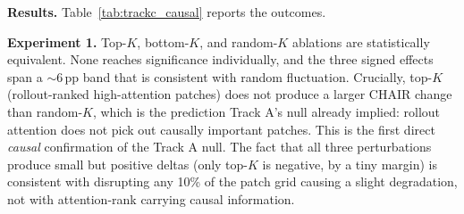\documentclass[11pt]{article}
\begin{document}
\textbf{Results.} Table~\ref{tab:trackc_causal} reports the outcomes.

\begin{table}[!ht]
\centering
\caption{Approach 2 part B causal ablation results. Wilcoxon signed-rank vs.\ baseline
         (paired, two-sided) for CHAIR change. McNemar tests hallucination-status flip
         for the matched-clean swap.}
\label{tab:trackc_causal}
\end{table}

\textbf{Experiment 1.} Top-$K$, bottom-$K$, and random-$K$ ablations are statistically
equivalent. None reaches significance individually, and the three signed effects span a
$\sim 6$\,pp band that is consistent with random fluctuation. Crucially, top-$K$
(rollout-ranked high-attention patches) does not produce a larger CHAIR change than
random-$K$, which is the prediction Track A's null already implied: rollout attention
does not pick out causally important patches. This is the first direct \emph{causal}
confirmation of the Track A null. The fact that all three perturbations produce small
but positive deltas (only top-$K$ is negative, by a tiny margin) is consistent with
disrupting any 10\% of the patch grid causing a slight degradation, not with
attention-rank carrying causal information.
\end{document}
